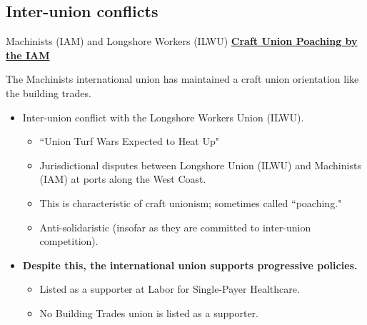 \documentclass{beamer}
\begin{document}
\subsection*{Inter-union conflicts}
\begin{frame}{Machinists (IAM) and Longshore Workers (ILWU)}
\underline{\textbf{Craft Union Poaching by the IAM}}\newline

The Machinists international union has maintained a craft union orientation like the building trades.
	\begin{itemize}
		\item Inter-union conflict with the Longshore Workers Union (ILWU).
		\begin{itemize}
			\item ``Union Turf Wars Expected to Heat Up" %
			\item Jurisdictional disputes between Longshore Union (ILWU) and Machinists (IAM) at ports along the West Coast.
			\item This is characteristic of craft unionism; sometimes called ``poaching."
			\item Anti-solidaristic (insofar as they are committed to inter-union competition).
		\end{itemize}
	\item \textbf{Despite this, the international union supports progressive policies.}
		\begin{itemize}
			\item Listed as a supporter at Labor for Single-Payer Healthcare.
			\item No Building Trades union is listed as a supporter.
		\end{itemize}
	\end{itemize}
\end{frame}
	
\end{document}
